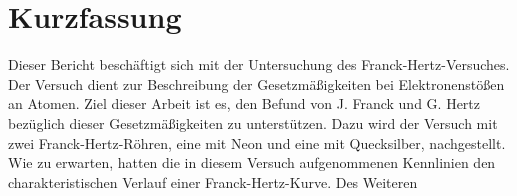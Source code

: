 \section{Kurzfassung}

Dieser Bericht beschäftigt sich mit der Untersuchung des Franck-Hertz-Versuches.
Der Versuch dient zur Beschreibung der Gesetzmäßigkeiten bei Elektronenstößen an Atomen.
Ziel dieser Arbeit ist es, den Befund von J. Franck und G. Hertz bezüglich dieser Gesetzmäßigkeiten zu unterstützen.
Dazu wird der Versuch mit zwei Franck-Hertz-Röhren, eine mit Neon und eine mit Quecksilber, nachgestellt.
Wie zu erwarten, hatten die in diesem Versuch aufgenommenen Kennlinien den charakteristischen Verlauf einer Franck-Hertz-Kurve.
Des Weiteren %